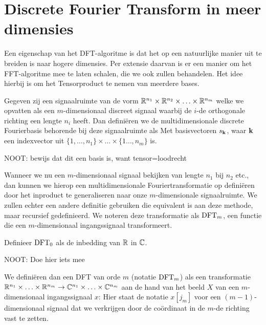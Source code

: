 \section{Discrete Fourier Transform in meer dimensies}
Een eigenschap van het DFT-algoritme is dat het op een natuurlijke manier uit te breiden is naar hogere dimensies.
Per extensie daarvan is er een manier om het FFT-algoritme mee te laten schalen, die we ook zullen behandelen.
Het idee hierbij is om het Tensorproduct te nemen van meerdere bases.

\begin{definitie} 
Gegeven zij een signaalruimte van de vorm
$\mathbb{R}^{n_1} \times \mathbb{R}^{n_2} \times \ldots \times \mathbb{R}^{n_m}$ welke we opvatten als
een $m$-dimensionaal discreet signaal waarbij de $i$-de orthogonale richting een lengte $n_i$ heeft.
Dan defini\"eren we de multidimensionale discrete Fourierbasis behorende bij deze signaalruimte als
Met basisvectoren $s_{\bold k}$, waar $\bold k$ een indexvector uit $\{1, \ldots, n_1\}\times\ldots\times\{1\ldots, n_m\}$ is.
\end{definitie}

NOOT: bewijs dat dit een basis is, want tensor=loodrecht

Wanneer we nu een $m$-dimensionaal signaal bekijken van lengte $n_1$ bij $n_2$ etc., dan kunnen we
hierop een multidimensionale Fouriertransformatie op defini\"eren door het inproduct te generaliseren naar 
onze $m$-dimensionale signaalruimte.
We zullen echter een andere definitie gebruiken die equivalent is aan deze methode, maar recursief gedefinieerd.
We noteren deze transformatie als $\text{DFT}_m$, een functie die een $m$-dimensionaal ingangssignaal transformeert.
\begin{definitie}
Definieer $\text{DFT}_0$ als de inbedding van $\mathbb{R}$ in $\mathbb{C}$.

NOOT: Doe hier iets mee

We defini\"eren dan een DFT van orde $m$ (notatie $\text{DFT}_m$) als een transformatie 
$\mathbb{R}^{n_1}\times\ldots\times\mathbb{R}^{n_m} \to \mathbb{C}^{n_1}\times\ldots\times\mathbb{C}^{n_m}$ aan de hand van het beeld $X$ van een $m$-dimensionaal ingangssignaal $x$:
Hier staat de notatie $x[j_m]$ voor een $(m-1)$-dimensionaal signaal dat we verkrijgen door de co\"ordinaat
in de $m$-de richting vast te zetten.
\end{definitie}

